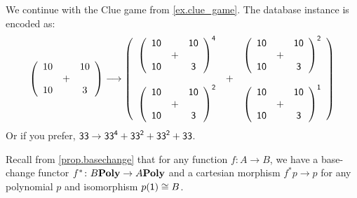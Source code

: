 \documentclass[DynamicalBook]{subfiles}
\begin{document}
\begin{example}\label{ex.clue_as_module}
We continue with the Clue game from \cref{ex.clue_game}. The database instance is encoded as:
\[
\left(
 \begin{array}{ccc}
 	10&&10\\
	&+\\
	10&&3
 \end{array}
\right)
\longrightarrow
\left(
	\begin{array}{ccc}
		\left(
 		\begin{array}{ccc}
  		\textsf{1}\textsf{0}&&\textsf{1}\textsf{0}\\
  		&+\\
  		\textsf{1}\textsf{0}&&\textsf{3}
   	\end{array}
		\right)^{\textsf{4}}
		&&
		\left(
 		\begin{array}{ccc}
  		\textsf{1}\textsf{0}&&\textsf{1}\textsf{0}\\
  		&+\\
  		\textsf{1}\textsf{0}&&\textsf{3}
   	\end{array}
		\right)^{\textsf{2}}
		\\
		&+\\
		\left(
 		\begin{array}{ccc}
  		\textsf{1}\textsf{0}&&\textsf{1}\textsf{0}\\
  		&+\\
  		\textsf{1}\textsf{0}&&\textsf{3}
   	\end{array}
		\right)^{\textsf{2}}
		&&
		\left(
 		\begin{array}{ccc}
  		\textsf{1}\textsf{0}&&\textsf{1}\textsf{0}\\
  		&+\\
  		\textsf{1}\textsf{0}&&\textsf{3}
   	\end{array}
		\right)^{\textsf{1}}
  \end{array}
\right)
\]
Or if you prefer, $\textsf{3}\textsf{3}\to\textsf{3}\textsf{3}^{\textsf{4}}+\textsf{3}\textsf{3}^{\textsf{2}}+\textsf{3}\textsf{3}^{\textsf{2}}+\textsf{3}\textsf{3}$.
\end{example}




Recall from \cref{prop.basechange} that for any function $f\colon A\to B$, we have a base-change functor $f^*\colon B\textbf{Poly}\to A\textbf{Poly}$ and a cartesian morphism $f^*p\to p$ for any polynomial $p$ and isomorphism $p(\textsf{1})\cong B$.
\end{document}
